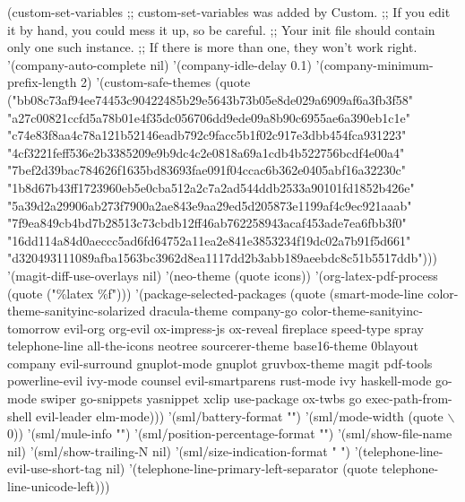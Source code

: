 \documentclass[11pt]{article}
\author{Andreas Fladstad}
\date{\today}
\title{}
\begin{document}
\tableofcontents

(custom-set-variables
 ;; custom-set-variables was added by Custom.
 ;; If you edit it by hand, you could mess it up, so be careful.
 ;; Your init file should contain only one such instance.
 ;; If there is more than one, they won't work right.
 '(company-auto-complete nil)
 '(company-idle-delay 0.1)
 '(company-minimum-prefix-length 2)
 '(custom-safe-themes
   (quote
    ("bb08c73af94ee74453c90422485b29e5643b73b05e8de029a6909af6a3fb3f58" "a27c00821ccfd5a78b01e4f35dc056706dd9ede09a8b90c6955ae6a390eb1c1e" "c74e83f8aa4c78a121b52146eadb792c9facc5b1f02c917e3dbb454fca931223" "4cf3221feff536e2b3385209e9b9dc4c2e0818a69a1cdb4b522756bcdf4e00a4" "7bef2d39bac784626f1635bd83693fae091f04ccac6b362e0405abf16a32230c" "1b8d67b43ff1723960eb5e0cba512a2c7a2ad544ddb2533a90101fd1852b426e" "5a39d2a29906ab273f7900a2ae843e9aa29ed5d205873e1199af4c9ec921aaab" "7f9ea849cb4bd7b28513c73cbdb12ff46ab762258943acaf453ade7ea6fbb3f0" "16dd114a84d0aeccc5ad6fd64752a11ea2e841e3853234f19dc02a7b91f5d661" "d320493111089afba1563bc3962d8ea1117dd2b3abb189aeebdc8c51b5517ddb")))
 '(magit-diff-use-overlays nil)
 '(neo-theme (quote icons))
 '(org-latex-pdf-process (quote ("\%latex \%f")))
 '(package-selected-packages
   (quote
    (smart-mode-line color-theme-sanityinc-solarized dracula-theme company-go color-theme-sanityinc-tomorrow evil-org org-evil ox-impress-js ox-reveal fireplace speed-type spray telephone-line all-the-icons neotree sourcerer-theme base16-theme 0blayout company evil-surround gnuplot-mode gnuplot gruvbox-theme magit pdf-tools powerline-evil ivy-mode counsel evil-smartparens rust-mode ivy haskell-mode go-mode swiper go-snippets yasnippet xclip use-package ox-twbs go exec-path-from-shell evil-leader elm-mode)))
 '(sml/battery-format "")
 '(sml/mode-width (quote $\backslash$0))
 '(sml/mule-info "")
 '(sml/position-percentage-format "")
 '(sml/show-file-name nil)
 '(sml/show-trailing-N nil)
 '(sml/size-indication-format " ")
 '(telephone-line-evil-use-short-tag nil)
 '(telephone-line-primary-left-separator (quote telephone-line-unicode-left)))
\end{document}
